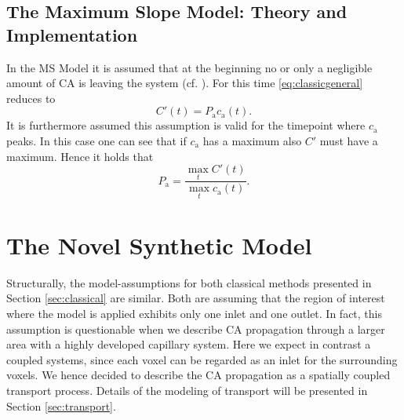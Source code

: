\documentclass[paper=a4, fontsize=11pt,parskip=half,headings=small]{scrartcl}
\newcommand{\ca}{c_\mathrm{a}}
\newcommand{\Pa}{P_{\mathrm{a}}}
\begin{document}
	
	
	
	\subsection{The Maximum Slope Model: Theory and Implementation}\label{sec:ms}	
	In the MS Model it is assumed that at the beginning no or only a negligible amount of CA is leaving the system (cf. \cite{klotz99}).
	For this time \eqref{eq:classicgeneral} reduces to 
	\[
		C'(t) = \Pa\ca(t).
	\]	
	It is furthermore assumed this assumption is valid for the timepoint where $\ca$ peaks.
	In this case one can see that if $\ca$ has a maximum also $C'$ must have a maximum.
	Hence it holds that
	\begin{equation}\label{eq:MS}
		\Pa = \frac{\max_{t}C'(t)}{\max_{t}\ca(t)}.
	\end{equation}
	
	
	
	\section{The Novel Synthetic Model}\label{sec:synthetic}
	
	Structurally, the model-assumptions for both classical methods presented in Section \ref{sec:classical} are similar.
	Both are assuming that the region of interest where the model is applied exhibits only one inlet and one outlet.
	In fact, this assumption is questionable when we describe CA propagation through a larger area with a highly developed capillary system.
	Here we expect in contrast a coupled systems, since each voxel can be regarded as an inlet for the surrounding voxels.
	We hence decided to describe the CA propagation as a spatially coupled transport process. 
	Details of the modeling of transport will be presented in Section \ref{sec:transport}.	
	
\end{document}
